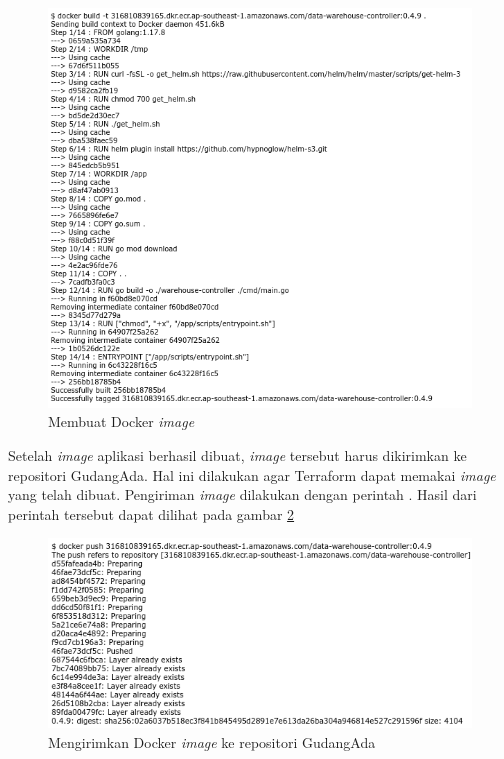 \begin{figure}
	\centering
	\includegraphics[width=1\textwidth]{pics/image-build.png}
	\caption{Membuat Docker \textit{image}}
	\label{fig:dockerBuild}
\end{figure}

Setelah \textit{image} aplikasi berhasil dibuat, \textit{image} tersebut harus dikirimkan ke repositori GudangAda. Hal ini dilakukan agar Terraform dapat memakai \textit{image} yang telah dibuat. Pengiriman \textit{image} dilakukan dengan perintah . Hasil dari perintah tersebut dapat dilihat pada gambar \ref{fig:dockerPush}

\begin{figure}
	\centering
	\includegraphics[width=1\textwidth]{pics/image-push.png}
	\caption{Mengirimkan Docker \textit{image} ke repositori GudangAda}
	\label{fig:dockerPush}
\end{figure}

